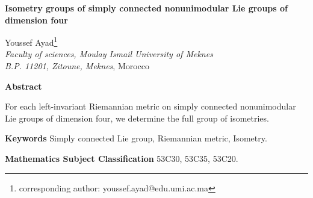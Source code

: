 \documentclass[12pt,a4paper,twoside]{article}
\theoremstyle{definition}
\begin{document}
\thispagestyle{empty}
\begin{center}
\noindent\textbf{{\Large Isometry groups of simply connected nonunimodular Lie groups of dimension four}}
\end{center}
\begin{center} \noindent Youssef Ayad\footnote{corresponding author: youssef.ayad@edu.umi.ac.ma}\\
	\small{\textit{Faculty of sciences, Moulay Ismail University of Meknes}}\\
	\small{\textit{B.P. 11201, Zitoune, Meknes}, Morocco}
\end{center}
\begin{center}
\textbf{Abstract}
\end{center}
\begin{center}
\hspace*{3mm}    For each left-invariant Riemannian metric on simply connected nonunimodular Lie groups of dimension four, we determine the full group of isometries.
\end{center}
\begin{center}
\textbf{Keywords} Simply connected Lie group, Riemannian metric, Isometry.
\end{center}
\begin{center}
\textbf{Mathematics Subject Classification} 53C30, 53C35, 53C20.	
\end{center}
\end{document}
